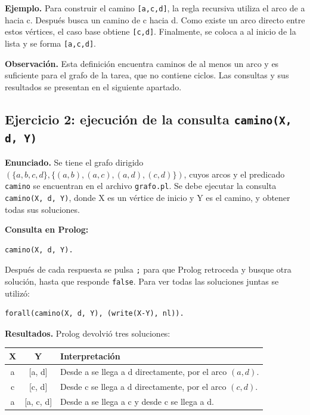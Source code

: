 \documentclass[12pt,letterpaper]{article}
\begin{document}
\noindent\textbf{Ejemplo.} Para construir el camino \texttt{[a,c,d]}, la regla recursiva
utiliza el arco de a hacia c. Después busca un camino de c hacia d. Como existe un
arco directo entre estos vértices, el caso base obtiene \texttt{[c,d]}.
Finalmente, se coloca a al inicio de la lista y se forma \texttt{[a,c,d]}.

\noindent\textbf{Observación.} Esta definición encuentra caminos de al menos un arco y es
suficiente para el grafo de la tarea, que no contiene ciclos. Las consultas y sus
resultados se presentan en el siguiente apartado.

\subsection{Ejercicio 2: ejecución de la consulta \texttt{camino(X, d, Y)}}
\label{sec:ejecucion}

\noindent\textbf{Enunciado.} Se tiene el grafo dirigido
$(\{a, b, c, d\}, \{(a, b), (a, c), (a, d), (c, d)\})$, cuyos arcos y el predicado
\texttt{camino} se encuentran en el archivo \texttt{grafo.pl}. Se debe ejecutar la
consulta \texttt{camino(X, d, Y)}, donde X es un vértice de inicio y Y es el
camino, y obtener todas sus soluciones.

\noindent\textbf{Consulta en Prolog:}

\begin{lstlisting}
camino(X, d, Y).
\end{lstlisting}

Después de cada respuesta se pulsa \texttt{;} para que Prolog retroceda y busque
otra solución, hasta que responde \texttt{false}. Para ver todas las soluciones
juntas se utilizó:

\begin{lstlisting}
forall(camino(X, d, Y), (write(X-Y), nl)).
\end{lstlisting}

\noindent\textbf{Resultados.} Prolog devolvió tres soluciones:

\begin{center}
\begin{tabular}{|c|c|p{6.5cm}|}
\hline
\textbf{X} & \textbf{Y} & \textbf{Interpretación} \\
\hline
a & [a, d] & Desde a se llega a d directamente, por el arco $(a, d)$. \\
\hline
c & [c, d] & Desde c se llega a d directamente, por el arco $(c, d)$. \\
\hline
a & [a, c, d] & Desde a se llega a c y desde c se llega a d. \\
\hline
\end{tabular}
\end{center}
\end{document}
